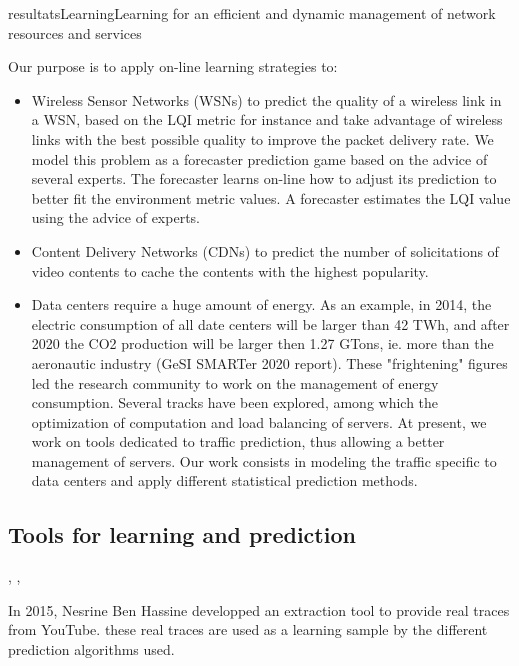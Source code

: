 \documentclass{ra2016}
\begin{document}
\begin{module}{resultats}{Learning}{Learning for an efficient and dynamic management of network resources and services}
 
Our purpose is to apply on-line learning strategies to:
\begin{itemize}
\item Wireless Sensor Networks (WSNs) to predict the quality of a wireless link in a WSN, based on the LQI metric for instance and take advantage of wireless links with the best possible quality to improve the packet delivery rate. We model this problem as a forecaster prediction game based on the advice of several experts. The forecaster learns on-line how to adjust its prediction to better fit the environment metric values. A forecaster estimates the LQI value using the advice of experts. 
\item Content Delivery Networks (CDNs) to predict the number of solicitations of video contents to cache the contents with the highest popularity.
\item Data centers require a huge amount of energy. As an example, in 2014, the electric consumption of all date centers will be larger than 42 TWh, and after 2020 the CO2 production will be larger then 1.27 GTons, ie. more than the aeronautic industry (GeSI SMARTer 2020 report). These "frightening" figures led the research community to work on the management of energy consumption. Several tracks have been explored, among which the optimization of computation and load balancing of servers. At present, we work on tools dedicated to traffic prediction, thus allowing a better management of servers. Our work consists in modeling the traffic specific to data centers and apply different statistical prediction methods.
\end{itemize}


\subsection{Tools for learning and prediction}
\begin{participants}
,
,
\end{participants}

In 2015, Nesrine Ben Hassine developped an extraction tool to provide real traces from YouTube. these real traces are used as a learning sample by the different prediction algorithms used.


\end{module}
\end{document}
